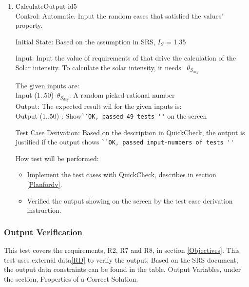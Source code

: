\documentclass[12pt, titlepage]{article}
\begin{document}
\begin{enumerate}
 

\item{CalculateOutput-id5\\}
Control: Automatic. Input the random cases that satisfied the values' property.

Initial State: Based on the assumption in SRS\cite{YS2019}, $I_{S}$ = 1.35

Input: Input the value of requirements of \progname that drive the calculation
of the Solar intensity. To calculate the solar intensity, it needs
~$\theta_{S_{day}}$

The given inputs are:\\ 
Input (1..50)~$\theta_{S_{day}}$: A random  picked rational number \\

Output: The expected result wil for the given inputs is:\\ 
Output (1..50) : Show\verb|``OK, passed 49 tests ''| on the screen\\



Test Case Derivation: Based on the description in QuickCheck\cite{QuickCheck},
the output is justified if the output shows \verb|``OK, passed input-numbers of tests ''|


How test will be performed:
 \begin{itemize} 
\item Implement the test cases with QuickCheck\cite{QuickCheck}, describes in 
section \ref{Planfordv}.
\item Verified the output showing on the screen by the test case derivation
instruction.
\end{itemize} 
\end{enumerate}

\subsubsection{Output Verification}\label{STD_VO} 

This test covers the requirements, R2, R7 and R8, in section \ref{Objectives}. This
test
uses external data\ref{RD} to verify the output. Based on the SRS 
document\cite{YS2019}, the output data constraints can be found in the
table, Output Variables, under the section, Properties of a Correct Solution. 
\end{document}
